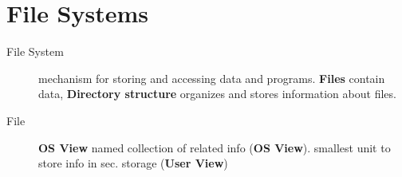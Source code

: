 \section*{File Systems}
\begin{description}
    \item[File System]mechanism for storing and accessing data and programs. \textbf{Files} contain data, \textbf{Directory structure} organizes and stores information about files.
    \item[File]\textbf{OS View}  named collection of related info (\textbf{OS View}). smallest unit to store info in sec. storage (\textbf{User View})

\end{description}
